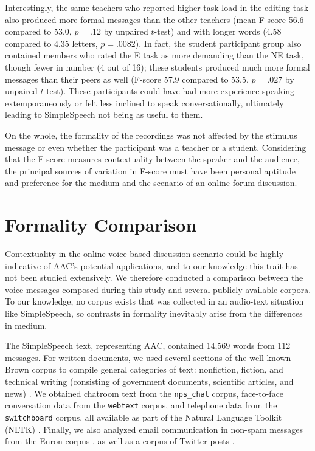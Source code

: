Interestingly, the same teachers who reported higher task load in the editing task also produced more formal messages than the other teachers (mean F-score 56.6 compared to 53.0, $p=.12$ by unpaired $t$-test) and with longer words (4.58 compared to 4.35 letters, $p=.0082$).
In fact, the student participant group also contained members who rated the E task as more demanding than the NE task, though fewer in number (4 out of 16); these students produced much more formal messages than their peers as well (F-score 57.9 compared to 53.5, $p=.027$ by unpaired $t$-test). 
These participants could have had more experience speaking extemporaneously or felt less inclined to speak conversationally, ultimately leading to SimpleSpeech not being as useful to them.

On the whole, the formality of the recordings was not affected by the stimulus message or even whether the participant was a teacher or a student.
Considering that the F-score measures contextuality between the speaker and the audience, the principal sources of variation in F-score must have been personal aptitude and preference for the medium and the scenario of an online forum discussion.

\section{Formality Comparison}
Contextuality in the online voice-based discussion scenario could be highly indicative of AAC's potential applications, and to our knowledge this trait has not been studied extensively.
We therefore conducted a comparison between the voice messages composed during this study and several publicly-available corpora.
To our knowledge, no corpus exists that was collected in an audio-text situation like SimpleSpeech, so contrasts in formality inevitably arise from the differences in medium. 

The SimpleSpeech text, representing AAC, contained 14,569 words from 112 messages.
For written documents, we used several sections of the well-known Brown corpus to compile general categories of text: nonfiction, fiction, and technical writing (consisting of government documents, scientific articles, and news) \cite{brown}.
We obtained chatroom text from the \texttt{nps\_chat} corpus, face-to-face conversation data from the \texttt{webtext} corpus, and telephone data from the \texttt{switchboard} corpus, all available as part of the Natural Language Toolkit (NLTK) \cite{nltk}.
Finally, we also analyzed email communication in non-spam messages from the Enron corpus \cite{enronsent}, as well as a corpus of Twitter posts \cite{twitter}.

